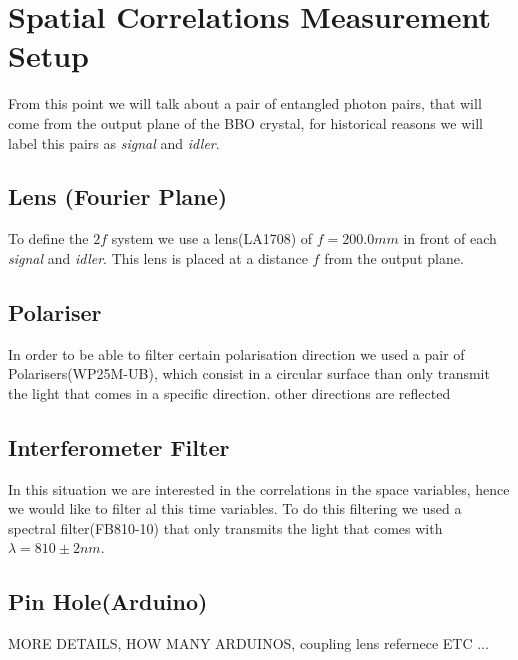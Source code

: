 \section{Spatial Correlations Measurement Setup}
From this point we will talk about a pair of entangled photon pairs, that will come from the output plane of the BBO 
crystal, for historical reasons we will label this pairs as \textit{signal} and \textit{idler}.


\subsection{Lens (Fourier Plane)}
To define the $2f$ system we use a lens(LA1708) of $f=200.0mm$ in front of each \textit{signal} and \textit{idler}. 
This lens is placed at a distance $f$ from the output plane.

\subsection{Polariser}
In order to be able to filter certain polarisation direction we used a pair of Polarisers(WP25M-UB), which consist 
in a circular surface than only transmit the light that comes in a specific direction. other directions are reflected

\subsection{Interferometer Filter}
In this situation we are interested in the correlations in the space variables, hence we would like to filter al this 
time variables. To do this filtering we used a spectral filter(FB810-10) that only transmits the light that comes
with $\lambda =810 \pm 2nm$.
\subsection{Pin Hole(Arduino)}
MORE DETAILS, HOW MANY ARDUINOS, coupling lens refernece ETC ...


